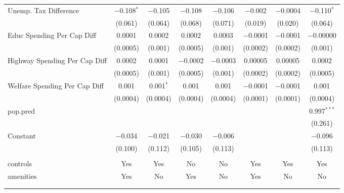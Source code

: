 \begin{table}[!htbp]
\begin{tabular}{@{\extracolsep{5pt}}lccccccc}
  Unemp. Tax Difference & $-$0.108$^{*}$ & $-$0.105 & $-$0.108 & $-$0.106 & $-$0.002 & $-$0.0004 & $-$0.110$^{*}$ \\ 
  & (0.061) & (0.064) & (0.068) & (0.071) & (0.019) & (0.020) & (0.064) \\ 
  Educ Spending Per Cap Diff & 0.0001 & 0.0002 & 0.0002 & 0.0003 & $-$0.0001 & $-$0.0001 & $-$0.00000 \\ 
  & (0.0005) & (0.001) & (0.0005) & (0.001) & (0.0002) & (0.0002) & (0.001) \\ 
  Highway Spending Per Cap Diff & 0.0002 & 0.0001 & $-$0.0002 & $-$0.0003 & 0.00005 & 0.00005 & 0.0002 \\ 
  & (0.0005) & (0.001) & (0.0005) & (0.001) & (0.0002) & (0.0002) & (0.0005) \\ 
  Welfare Spending Per Cap Diff & 0.001 & 0.001$^{*}$ & 0.001 & 0.001 & $-$0.0001 & $-$0.0001 & 0.001 \\ 
  & (0.0004) & (0.0004) & (0.0004) & (0.0004) & (0.0001) & (0.0001) & (0.0004) \\ 
  pop.pred &  &  &  &  &  &  & 0.997$^{***}$ \\ 
  &  &  &  &  &  &  & (0.261) \\ 
  Constant & $-$0.034 & $-$0.021 & $-$0.030 & $-$0.006 &  &  & $-$0.096 \\ 
  & (0.100) & (0.112) & (0.105) & (0.113) &  &  & (0.113) \\ 
 \hline \\[-1.8ex] 
controls & Yes & Yes & No & No & Yes & Yes & Yes \\ 
amenities & Yes & No & Yes & No & Yes & No & No \\ 
\hline \\[-1.8ex] 
\hline 
\hline \\[-1.8ex] 
\end{tabular} 
\end{table} 
